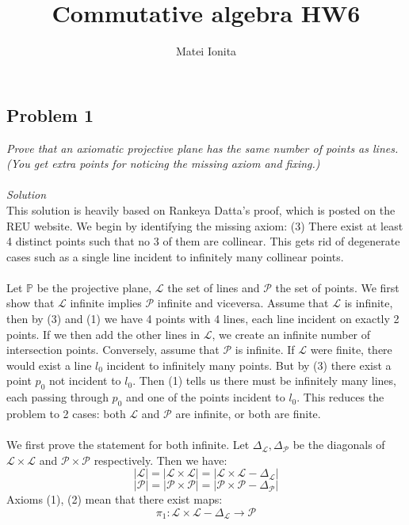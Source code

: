 \documentclass[12 pt]{article}
\title{Commutative algebra HW6}
\author{Matei Ionita}
\begin{document}
  \maketitle

\subsection*{Problem 1}
\emph{Prove that an axiomatic projective plane has the same number of points as lines. (You get extra points for noticing the missing axiom and fixing.)}
\\
\\
\emph{Solution}
\\
This solution is heavily based on Rankeya Datta's proof, which is posted on the REU website. We begin by identifying the missing axiom: (3) There exist at least 4 distinct points such that no 3 of them are collinear. This gets rid of degenerate cases such as a single line incident to infinitely many collinear points.
\\
\\
Let $\mathbb{P}$ be the projective plane, $\mathcal{L}$ the set of lines and $\mathcal{P}$ the set of points. We first show that $\mathcal{L}$ infinite implies $\mathcal{P}$ infinite and viceversa. Assume that $\mathcal{L}$ is infinite, then by (3) and (1) we have 4 points with 4 lines, each line incident on exactly 2 points. If we then add the other lines in $\mathcal{L}$, we create an infinite number of intersection points. Conversely, assume that $\mathcal{P}$ is infinite. If $\mathcal{L}$ were finite, there would exist a line $l_0$ incident to infinitely many points. But by (3) there exist a point $p_0$ not incident to $l_0$. Then (1) tells us there must be infinitely many lines, each passing through $p_0$ and one of the points incident to $l_0$. This reduces the problem to 2 cases: both $\mathcal{L}$ and $\mathcal{P}$ are infinite, or both are finite.
\\
\\
We first prove the statement for both infinite. Let $\Delta_{\mathcal{L}}, \Delta_{\mathcal{P}}$ be the diagonals of $\mathcal{L} \times \mathcal{L}$ and $\mathcal{P} \times \mathcal{P}$ respectively. Then we have:
\[      |\mathcal{L}| = |\mathcal{L} \times \mathcal{L}| = |\mathcal{L} \times \mathcal{L} - \Delta_{\mathcal{L}} |        \]
\[      |\mathcal{P}| = |\mathcal{P} \times \mathcal{P}| = |\mathcal{P} \times \mathcal{P} - \Delta_{\mathcal{P}} |        \]
Axioms (1), (2) mean that there exist maps:
\[       \pi_1 :    \mathcal{L} \times \mathcal{L} - \Delta_{\mathcal{L}} \to \mathcal{P}  \]
\end{document}
